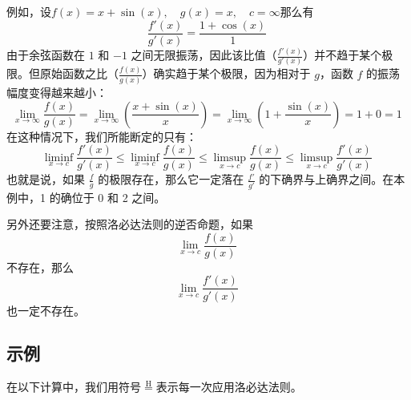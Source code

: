 例如，设$f(x) = x + \sin(x),\quad g(x) = x,\quad c = \infty$那么有
$$
\frac{f'(x)}{g'(x)} = \frac{1 + \cos(x)}{1}~
$$
由于余弦函数在 $1$ 和 $-1$ 之间无限振荡，因此该比值（$\frac{f'(x)}{g'(x)}$）并不趋于某个极限。但原始函数之比（$\frac{f(x)}{g(x)}$）确实趋于某个极限，因为相对于 $g$，函数 $f$ 的振荡幅度变得越来越小：
$$
\lim_{x \to \infty} \frac{f(x)}{g(x)} = \lim_{x \to \infty} \left( \frac{x + \sin(x)}{x} \right) = \lim_{x \to \infty} \left( 1 + \frac{\sin(x)}{x} \right) = 1 + 0 = 1~
$$
在这种情况下，我们所能断定的只有：
$$
\liminf_{x \to c} \frac{f'(x)}{g'(x)} \leq \liminf_{x \to c} \frac{f(x)}{g(x)} \leq \limsup_{x \to c} \frac{f(x)}{g(x)} \leq \limsup_{x \to c} \frac{f'(x)}{g'(x)}~
$$
也就是说，如果 $\frac{f}{g}$ 的极限存在，那么它一定落在 $\frac{f'}{g'}$ 的下确界与上确界之间。在本例中，1 的确位于 0 和 2 之间。

另外还要注意，按照洛必达法则的逆否命题，如果
$$
\lim_{x \to c} \frac{f(x)}{g(x)}~
$$
不存在，那么
$$
\lim_{x \to c} \frac{f'(x)}{g'(x)}~
$$
也一定不存在。
\subsection{示例}
在以下计算中，我们用符号$\stackrel{\mathrm{H}}{=}$表示每一次应用洛必达法则。

